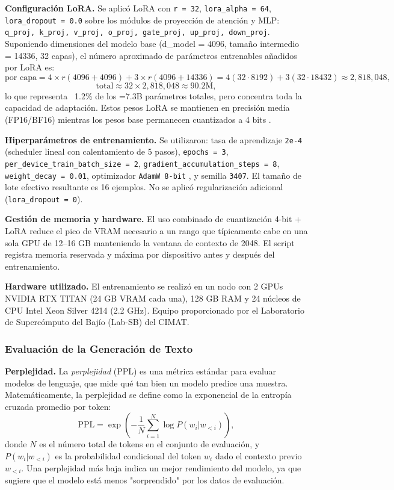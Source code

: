 \documentclass[paper=letter, fontsize=11pt, draft=false]{scrartcl}
\numberwithin{equation}{section} %
\numberwithin{figure}{section} %
\numberwithin{table}{section} %
\numberwithin{subsection}{section}
\begin{document}
\textbf{Configuración LoRA.} Se aplicó LoRA con \texttt{r = 32}, \texttt{lora\_alpha = 64}, \texttt{lora\_dropout = 0.0} sobre los módulos de proyección de atención y MLP: \texttt{q\_proj, k\_proj, v\_proj, o\_proj, gate\_proj, up\_proj, down\_proj}. Suponiendo dimensiones del modelo base (d\_model = 4096, tamaño intermedio = 14336, 32 capas), el número aproximado de parámetros entrenables añadidos por LoRA es:
\[
\text{por capa} = 4 \times r (4096 + 4096) + 3 \times r (4096 + 14336) = 4(32 \cdot 8192) + 3(32 \cdot 18432) \approx 2{,}818{,}048,
\]
\[
\text{total} \approx 32 \times 2{,}818{,}048 \approx 90.2\text{M},
\]
lo que representa ~1.2\% de los =7.3B parámetros totales, pero concentra toda la capacidad de adaptación. Estos pesos LoRA se mantienen en precisión media (FP16/BF16) mientras los pesos base permanecen cuantizados a 4 bits \cite{dettmers2023qloraefficientfinetuningquantized}.

\textbf{Hiperparámetros de entrenamiento.} Se utilizaron: tasa de aprendizaje \texttt{2e-4} (scheduler lineal con calentamiento de 5 pasos), \texttt{epochs = 3}, \texttt{per\_device\_train\_batch\_size = 2}, \texttt{gradient\_accumulation\_steps = 8}, \texttt{weight\_decay = 0.01}, optimizador \texttt{AdamW 8-bit} \cite{dettmers2022optimizers}, y semilla \texttt{3407}. El tamaño de lote efectivo resultante es 16 ejemplos. No se aplicó regularización adicional (\texttt{lora\_dropout = 0}).

\textbf{Gestión de memoria y hardware.} El uso combinado de cuantización 4-bit + LoRA reduce el pico de VRAM necesario a un rango que típicamente cabe en una sola GPU de 12–16 GB manteniendo la ventana de contexto de 2048. El script registra memoria reservada y máxima por dispositivo antes y después del entrenamiento. 

\textbf{Hardware utilizado.} El entrenamiento se realizó en un nodo con 2 GPUs NVIDIA RTX TITAN (24 GB VRAM cada una), 128 GB RAM y 24 núcleos de CPU Intel Xeon Silver 4214 (2.2 GHz). Equipo proporcionado por el Laboratorio de Supercómputo del Bajío (Lab-SB) del CIMAT. 

\subsubsection{Evaluación de la Generación de Texto}

\textbf{Perplejidad.} La \emph{perplejidad} (PPL) es una métrica estándar para evaluar modelos de lenguaje, que mide qué tan bien un modelo predice una muestra. Matemáticamente, la perplejidad se define como la exponencial de la entropía cruzada promedio por token:
\[
\text{PPL} = \exp\left(-\frac{1}{N} \sum_{i=1}^{N} \log P(w_i | w_{<i})\right),
\]
donde \(N\) es el número total de tokens en el conjunto de evaluación, y \(P(w_i | w_{<i})\) es la probabilidad condicional del token \(w_i\) dado el contexto previo \(w_{<i}\). Una perplejidad más baja indica un mejor rendimiento del modelo, ya que sugiere que el modelo está menos "sorprendido" por los datos de evaluación.
\end{document}

